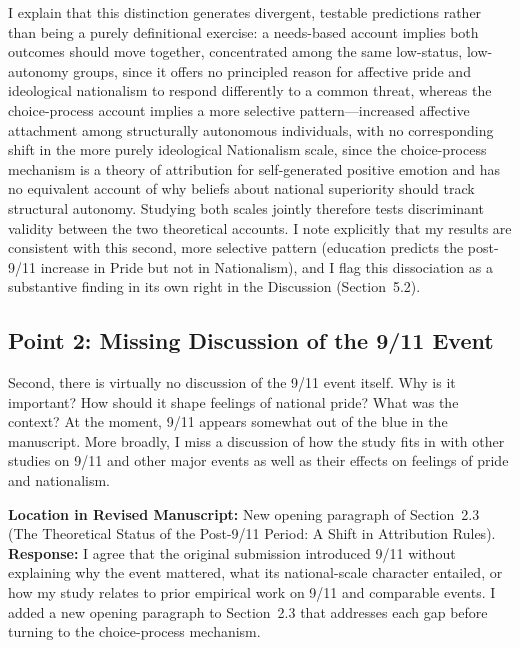 \documentclass[11pt]{article}
\begin{document}
I explain that this distinction generates divergent, testable predictions rather than being a purely definitional exercise: a needs-based account implies both outcomes should move together, concentrated among the same low-status, low-autonomy groups, since it offers no principled reason for affective pride and ideological nationalism to respond differently to a common threat, whereas the choice-process account implies a more selective pattern---increased affective attachment among structurally autonomous individuals, with no corresponding shift in the more purely ideological Nationalism scale, since the choice-process mechanism is a theory of attribution for self-generated positive emotion and has no equivalent account of why beliefs about national superiority should track structural autonomy. Studying both scales jointly therefore tests discriminant validity between the two theoretical accounts. I note explicitly that my results are consistent with this second, more selective pattern (education predicts the post-9/11 increase in Pride but not in Nationalism), and I flag this dissociation as a substantive finding in its own right in the Discussion (Section~5.2).

\subsection*{Point 2: Missing Discussion of the 9/11 Event}

\begin{reviewercomment}
Second, there is virtually no discussion of the 9/11 event itself. Why is it important? How should it shape feelings of national pride? What was the context? At the moment, 9/11 appears somewhat out of the blue in the manuscript. More broadly, I miss a discussion of how the study fits in with other studies on 9/11 and other major events as well as their effects on feelings of pride and nationalism.
\end{reviewercomment}

\noindent\textbf{Location in Revised Manuscript:} New opening paragraph of Section~2.3 (The Theoretical Status of the Post-9/11 Period: A Shift in Attribution Rules).\\[4pt]
\textbf{Response:} I agree that the original submission introduced 9/11 without explaining why the event mattered, what its national-scale character entailed, or how my study relates to prior empirical work on 9/11 and comparable events. I added a new opening paragraph to Section~2.3 that addresses each gap before turning to the choice-process mechanism.
\end{document}
